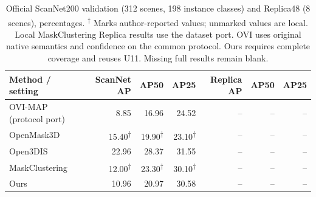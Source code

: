 \begin{table}[t]
\centering
\small
\caption{Official ScanNet200 validation (312 scenes, 198 instance classes) and Replica48 (8 scenes), percentages. \textsuperscript{$\dagger$} Marks author-reported values; unmarked values are local. Local MaskClustering Replica results use the dataset port. OVI uses original native semantics and confidence on the common protocol. Ours requires complete coverage and reuses U11. Missing full results remain blank.}
\label{tab:benchmark-t1}
\begin{tabular}{lrrrrrr}
\toprule
Method / setting & ScanNet AP & AP50 & AP25 & Replica AP & AP50 & AP25 \\
\midrule
OVI-MAP (protocol port) & 8.85 & 16.96 & 24.52 & -- & -- & -- \\
OpenMask3D & 15.40\textsuperscript{$\dagger$} & 19.90\textsuperscript{$\dagger$} & 23.10\textsuperscript{$\dagger$} & -- & -- & -- \\
Open3DIS & 22.96 & 28.37 & 31.55 & -- & -- & -- \\
MaskClustering & 12.00\textsuperscript{$\dagger$} & 23.30\textsuperscript{$\dagger$} & 30.10\textsuperscript{$\dagger$} & -- & -- & -- \\
Ours & 10.96 & 20.97 & 30.58 & -- & -- & -- \\
\bottomrule
\end{tabular}
\end{table}
